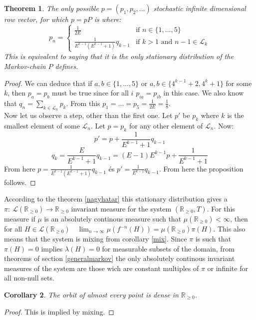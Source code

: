 \documentclass{article}
\newtheorem{theorem}{Theorem}[section]
\newtheorem{cor}[theorem]{Corollary}
\begin{document}
\begin{theorem}
The only possible $p = (p_1, p_2, ...)$ stochastic infinite dimensional row vector, for which $p = pP$ is where:\[
p_n = 
\begin{cases}
 \frac{1}{2E} & \text{if } n \in \{1,...,5\}\\
 \frac{1}{E^{k-1}(E^{k-1}+1)}q_{k-1} & \text{if } k>1 \text{ and } n-1 \in \mathscr{L}_k 
\end{cases}
\]
This is equivalent to saying that it is the only stationary distribution of the Markov-chain $P$ defines.
\end{theorem}

\begin{proof}
We can deduce that if $a,b \in \{1,...,5\}$ or $a,b \in \{4^{k-1}+2, 4^k+1\}$ for some $k$, then $p_a = p_b$ must be true since for all $i$ $p_{ia}=p_{ib}$ in this case. We also know that $q_n = \sum_{k \in \mathscr{L}_n} p_k$. From this $p_1 =...=p_5 = \frac{1}{2E} =\frac{1}{8}$.\\

Now let us observe a step, other than the first one. Let $p'$ be $p_k$ where $k$ is the smallest element of some $\mathscr{L}_n$. Let $p = p_k$ for any other element of $\mathscr{L}_n$. Now: \[
p'=p+\frac{1}{E^{k-1}+1}q_{k-1}
\]
\[
q_k=\frac{E}{E^{k-1}+1}q_{k-1}=(E-1)E^{k-1}p + \frac{1}{E^{k-1}+1}
\]
From here $p = \frac{1}{E^{k-1}(E^{k-1}+1)}q_{k-1}$ és $p'=\frac{1}{E^{k-1}}q_{k-1}$. From here the proposition follows.
\end{proof}

According to the theorem \ref{nagyhatar} this stationary distribution gives a $\pi:\:\mathscr{L}(\mathbb{R}_{\geq0}) \rightarrow \mathbb{R}_{\geq 0}$ invariant measure for the system $(\mathbb{R}_{\geq 0}, T)$. For this measure if $\mu$ is an absolutely continous measure such that $\mu(\mathbb{R}_{\geq 0})<\infty$, then for all $H \in \mathscr{L}( \mathbb{R}_{\geq 0} ) \quad \lim_{n\rightarrow \infty}\mu(f^{-n}(H)) =\mu(\mathbb{R}_{\geq 0})\pi(H)$. This also means that the system is mixing from corollary \ref{mix}. Since $\pi$ is such that $\pi(H) = 0$ implies $\lambda(H) = 0$ for measurable subsets of the domain, from theorems of section \ref{generalmarkov} the only absolutely continous invariant measures of the system are those wich are constant multiples of $\pi$ or infinite for all non-null sets.

\begin{cor}
The orbit of almost every point is dense in $\mathbb{R}_{\geq 0}$.
\end{cor}
\begin{proof}
This is implied by mixing.
\end{proof}
\end{document}
